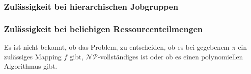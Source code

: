 \documentclass{scrreprt}
\begin{document}
\subsubsection{Zulässigkeit bei hierarchischen Jobgruppen}
%


\subsubsection{Zulässigkeit bei beliebigen Ressourcenteilmengen}
Es ist nicht bekannt, ob das Problem, zu entscheiden, ob es bei gegebenem $\pi$ ein zulässiges Mapping $f$ gibt, 
$\mathcal{NP}$-vollständiges ist oder ob es einen polynomiellen Algorithmus gibt.
\end{document}
